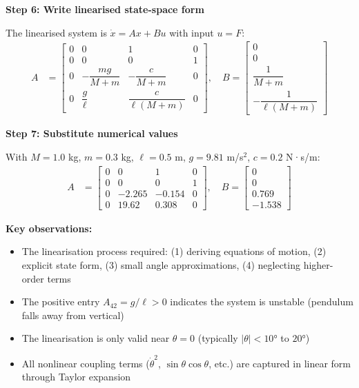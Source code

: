 \documentclass[11pt,a4paper]{article}
\begin{document}
\textbf{Step 6: Write linearised state-space form}

The linearised system is $\dot{x} = Ax + Bu$ with input $u = F$:
\begin{align}
  A &= \begin{bmatrix}
    0 & 0 & 1 & 0\\
    0 & 0 & 0 & 1\\
    0 & -\dfrac{mg}{M+m} & -\dfrac{c}{M+m} & 0\\[0.5em]
    0 & \dfrac{g}{\ell} & \dfrac{c}{\ell(M+m)} & 0
  \end{bmatrix}, \quad
  B = \begin{bmatrix}
    0\\[0.2em]
    0\\[0.2em]
    \dfrac{1}{M+m}\\[0.5em]
    -\dfrac{1}{\ell(M+m)}
  \end{bmatrix}
\end{align}

\textbf{Step 7: Substitute numerical values}

With $M = 1.0$ kg, $m = 0.3$ kg, $\ell = 0.5$ m, $g = 9.81$ m/s$^2$, $c = 0.2$ N·s/m:
\begin{align}
  A &= \begin{bmatrix}
    0 & 0 & 1 & 0\\
    0 & 0 & 0 & 1\\
    0 & -2.265 & -0.154 & 0\\
    0 & 19.62 & 0.308 & 0
  \end{bmatrix}, \quad
  B = \begin{bmatrix}
    0\\
    0\\
    0.769\\
    -1.538
  \end{bmatrix}
\end{align}

\textbf{Key observations:}
\begin{itemize}
  \item The linearisation process required: (1) deriving equations of motion, (2) explicit state form, (3) small angle approximations, (4) neglecting higher-order terms
  \item The positive entry $A_{42} = g/\ell > 0$ indicates the system is unstable (pendulum falls away from vertical)
  \item The linearisation is only valid near $\theta = 0$ (typically $|\theta| < 10°$ to $20°$)
  \item All nonlinear coupling terms ($\dot{\theta}^2$, $\sin\theta\cos\theta$, etc.) are captured in linear form through Taylor expansion
\end{itemize}
\end{document}

